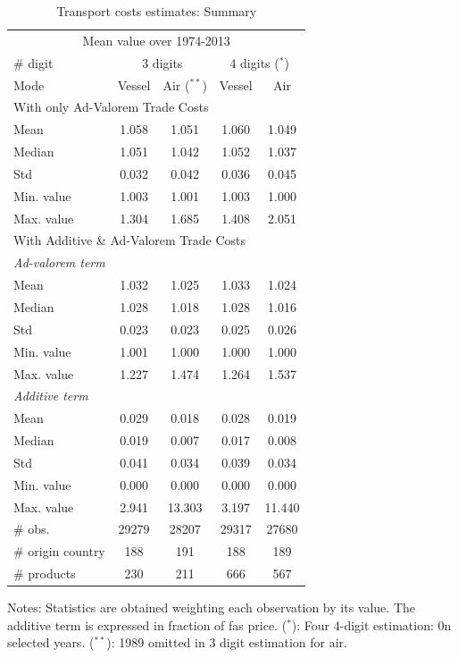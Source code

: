 \documentclass[a4paper,11pt]{article}
\begin{document}
\begin{table}[htbp]
  \centering
  \footnotesize{
  \caption{Transport costs estimates: Summary \label{tab:summary_results}}
  \begin{center}
    \begin{tabular}{l|cc|cc}
      \hline \hline
    \multicolumn{5}{c}{Mean value over 1974-2013}   \\
    \# digit & \multicolumn{2}{c}{3 digits} & \multicolumn{2}{c}{4 digits ($^\ast$)} \\ \hline
    Mode  & Vessel & Air ($^{\ast \ast}$) & Vessel & Air \\ \hline
    \multicolumn{5}{l}{With only Ad-Valorem Trade Costs }  \\ \hline
    Mean  & 1.058 & 1.051 & 1.060 & 1.049 \\
    Median & 1.051 & 1.042 & 1.052 & 1.037 \\
    Std   & 0.032 & 0.042 & 0.036 & 0.045 \\
    Min. value & 1.003 & 1.001 & 1.003 & 1.000 \\
    Max. value & 1.304 & 1.685 & 1.408 & 2.051 \\ \hline
    \multicolumn{5}{l}{With Additive \& Ad-Valorem Trade Costs } \\ \hline
   \textit{Ad-valorem term} & & & & \\ \hline
    Mean  & 1.032 & 1.025 & 1.033 & 1.024 \\
    Median & 1.028 & 1.018 & 1.028 & 1.016 \\
    Std   & 0.023 & 0.023 & 0.025 & 0.026 \\
    Min. value & 1.001 & 1.000 & 1.000 & 1.000 \\
    Max. value & 1.227 & 1.474 & 1.264 & 1.537 \\ \hline
    \textit{Additive term }& & & &   \\ \hline
    Mean  & 0.029 & 0.018 & 0.028 & 0.019 \\
    Median & 0.019 & 0.007 & 0.017 & 0.008 \\
    Std   & 0.041 & 0.034 & 0.039 & 0.034 \\
    Min. value & 0.000 & 0.000 & 0.000 & 0.000 \\
    Max. value & 2.941 & 13.303 & 3.197 & 11.440 \\ \hline
        \# obs. & 29279 & 28207 & 29317 & 27680 \\
    \# origin country & 188 & 191 & 188 & 189 \\
    \# products & 230 & 211 & 666 & 567 \\  \hline \hline
  \end{tabular}
    \end{center}}
\parbox[l]{8cm}{\tiny{Notes: Statistics are obtained weighting each observation by its value. The additive term is expressed in fraction of fas price. ($^\ast$): Four 4-digit estimation: 0n selected years. ($^{\ast \ast}$): 1989 omitted in 3 digit estimation for air.}}
\end{table}%
\end{document}
